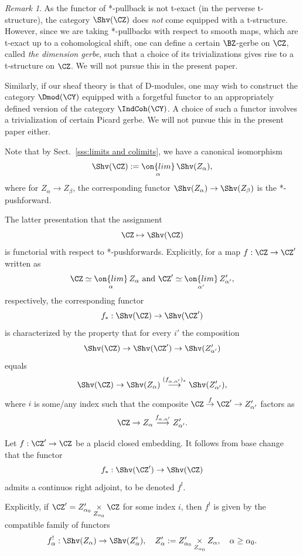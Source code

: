 \documentclass[9pt]{amsart}
\theoremstyle{definition}
\theoremstyle{remark}
\newtheorem{rem}[subsubsection]{Remark}
\newcommand{\secref}[1]{Sect.~\ref{#1}}
\numberwithin{equation}{section}
\begin{document}
\begin{rem}
As the functor of *-pullback is not t-exact (in the perverse t-structure), the category $\Shv(\CZ)$ does \emph{not} 
come equipped with a t-structure. However, since we are taking *-pullbacks with respect to smooth maps, which
are t-exact up to a cohomological shift, one can define a certain $\BZ$-gerbe on $\CZ$, called \emph{the dimension gerbe},
such that a choice of its trivializations gives rise to a t-structure on $\CZ$. 
We will not pursue this in the present paper. 

\medskip

Similarly, if our sheaf theory is that of D-modules, one may wish to construct the category $\Dmod(\CY)$ equipped with a 
forgetful functor to an appropriately defined version of the category $\IndCoh(\CY)$. A choice of such a functor involves 
a trivialization of certain Picard gerbe. We will not pursue this in the present paper either. 
\end{rem} 

\sssec{}

Note that by \secref{sss:limits and colimits}, we have a canonical isomorphism 
$$\Shv(\CZ):=\underset{\alpha}{\on{lim}}\, \Shv(Z_\alpha),$$
where for $Z_\alpha\to Z_\beta$, the corresponding functor $\Shv(Z_\alpha)\to \Shv(Z_\beta)$ 
is the *-pushforward. 

\sssec{}

The latter presentation that the assignment
$$\CZ\mapsto \Shv(\CZ)$$
is functorial with respect to *-pushforwards. Explicitly, for a map $f:\CZ\to \CZ'$
written as 
$$\CZ\simeq \underset{\alpha}{\on{lim}}\, Z_\alpha \text{ and } \CZ'\simeq \underset{\alpha'}{\on{lim}}\, Z'_{\alpha'},$$
respectively, the corresponding functor
$$f_*:\Shv(\CZ)\to \Shv(\CZ')$$
is characterized by the property that for every $i'$ the composition
$$\Shv(\CZ)\to \Shv(\CZ')\to \Shv(Z'_{\alpha'})$$
equals 
$$\Shv(\CZ)\to \Shv(Z_\alpha)\overset{(f_{\alpha,\alpha'})_*}\longrightarrow \Shv(Z'_{\alpha'}),$$
where $i$ is some/any index such that the composite $\CZ\overset{f}\to \CZ'\to Z'_{\alpha'}$
factors as 
$$\CZ\to Z_\alpha\overset{f_{\alpha,\alpha'}}\longrightarrow Z'_{\alpha'}.$$

\sssec{}

Let $f:\CZ'\to \CZ$ be a placid closed embedding. It follows from base change that the functor
$$f_*:\Shv(\CZ')\to \Shv(\CZ)$$
admits a continuos right adjoint, to be denoted $f^!$. 

\medskip

Explicitly, if $\CZ'=Z'_{\alpha_0}\underset{Z_{\alpha_0}}\times \CZ$ for some index $i$, then $f^!$ is given by the
compatible family of functors
$$f_\alpha^!:\Shv(Z_\alpha)\to \Shv(Z'_\alpha), \quad Z'_\alpha:=Z'_{\alpha_0}\underset{Z_{\alpha_0}}\times Z_\alpha, \quad \alpha\geq \alpha_0.$$
\end{document}
